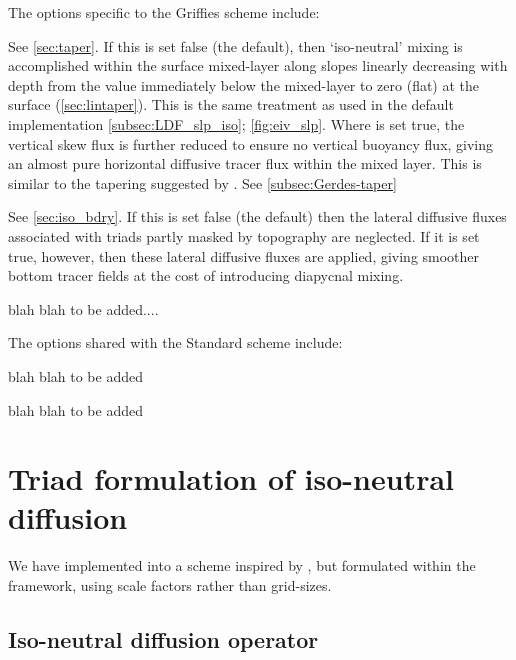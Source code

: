 \documentclass[../main/NEMO_manual]{subfiles}
\begin{document}
The options specific to the Griffies scheme include:
\begin{description}[font=\normalfont]
\item[\np{ln\_triad\_iso}]
  See \autoref{sec:taper}.
  If this is set false (the default),
  then `iso-neutral' mixing is accomplished within the surface mixed-layer along slopes linearly decreasing with
  depth from the value immediately below the mixed-layer to zero (flat) at the surface (\autoref{sec:lintaper}).
  This is the same treatment as used in the default implementation
  \autoref{subsec:LDF_slp_iso}; \autoref{fig:eiv_slp}.
  Where  is set true,
  the vertical skew flux is further reduced to ensure no vertical buoyancy flux,
  giving an almost pure horizontal diffusive tracer flux within the mixed layer.
  This is similar to the tapering suggested by \citet{Gerdes1991}. See \autoref{subsec:Gerdes-taper}
\item[\np{ln\_botmix\_triad}]
  See \autoref{sec:iso_bdry}. 
  If this is set false (the default) then the lateral diffusive fluxes
  associated with triads partly masked by topography are neglected. 
  If it is set true, however, then these lateral diffusive fluxes are applied, 
  giving smoother bottom tracer fields at the cost of introducing diapycnal mixing.
\item[\np{rn\_sw\_triad}]
  blah blah to be added....
\end{description}
The options shared with the Standard scheme include:
\begin{description}[font=\normalfont]
\item[\np{ln\_traldf\_msc}]   blah blah to be added
\item[\np{rn\_slpmax}]  blah blah to be added
\end{description}

\section{Triad formulation of iso-neutral diffusion}
\label{sec:iso}

We have implemented into \NEMO a scheme inspired by \citet{Griffies_al_JPO98},
but formulated within the \NEMO framework, using scale factors rather than grid-sizes.

\subsection{Iso-neutral diffusion operator}
\end{document}
